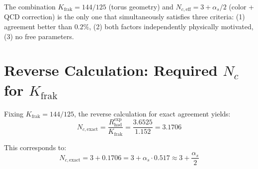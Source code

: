 	\begin{table}[h]
		\centering
		\caption{Results of the systematic scan. The combination $K_\text{frak} = 144/125$ with $N_{c,\text{eff}} = 3 + \alpha_s/2$ yields the best agreement.}
		\label{tab:scan}
	\end{table}
	
	\begin{keypoint}
		The combination $K_\text{frak} = 144/125$ (torus geometry) and $N_{c,\text{eff}} = 3 + \alpha_s/2$ (color + QCD correction) is the only one that simultaneously satisfies three criteria: (1) agreement better than $0.2\%$, (2) both factors independently physically motivated, (3) no free parameters.
	\end{keypoint}
	
	
	\section{Reverse Calculation: Required $N_c$ for $K_\text{frak}$}
	
	Fixing $K_\text{frak} = 144/125$, the reverse calculation for exact agreement yields:
	\begin{equation}
		N_{c,\text{exact}} = \frac{R_\text{had}^\text{exp}}{K_\text{frak}} = \frac{3.6525}{1.152} = 3.1706
	\end{equation}
	
	This corresponds to:
	\begin{equation}
		N_{c,\text{exact}} = 3 + 0.1706 = 3 + \alpha_s \cdot 0.517 \approx 3 + \frac{\alpha_s}{2}
	\end{equation}
	
